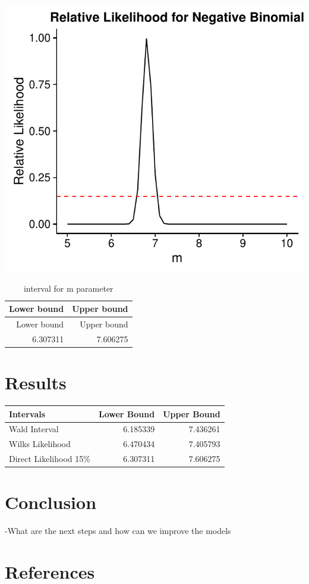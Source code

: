 \documentclass[11pt,preprint, authoryear]{elsarticle}
\let\origtable\table
\let\endorigtable\endtable
\renewenvironment{table}[1][2] {
    \expandafter\origtable\expandafter[H]
} {
    \endorigtable
}
\numberwithin{equation}{section}
\numberwithin{figure}{section}
\numberwithin{table}{section}
\begin{document}
\includegraphics{likelihood_files/figure-latex/unnamed-chunk-6-1.pdf}

\begin{longtable}[]{@{}rr@{}}
\caption{interval for m parameter}\tabularnewline
\toprule
Lower bound & Upper bound\tabularnewline
\midrule
\endfirsthead
\toprule
Lower bound & Upper bound\tabularnewline
\midrule
\endhead
6.307311 & 7.606275\tabularnewline
\bottomrule
\end{longtable}

\section{Results}\label{results}

\begin{table}

\caption{\label{tab:intervals}Intervals for m parameter}
\centering
\begin{tabular}[t]{lrr}
\toprule
Intervals & Lower Bound & Upper Bound\\
\midrule
Wald Interval & 6.185339 & 7.436261\\
Wilks Likelihood & 6.470434 & 7.405793\\
Direct Likelihood 15\% & 6.307311 & 7.606275\\
\bottomrule
\end{tabular}
\end{table}

\section{Conclusion}\label{conclusion}

-What are the next steps and how can we improve the models

\section{References}\label{references}

\newpage
\nocite{*}

\end{document}
